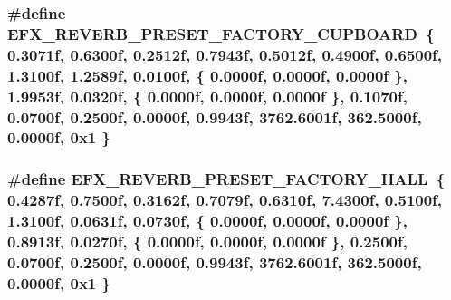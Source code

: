 \subsubsection[{\texorpdfstring{E\+F\+X\+\_\+\+R\+E\+V\+E\+R\+B\+\_\+\+P\+R\+E\+S\+E\+T\+\_\+\+F\+A\+C\+T\+O\+R\+Y\+\_\+\+C\+U\+P\+B\+O\+A\+RD}{EFX_REVERB_PRESET_FACTORY_CUPBOARD}}]{\setlength{\rightskip}{0pt plus 5cm}\#define E\+F\+X\+\_\+\+R\+E\+V\+E\+R\+B\+\_\+\+P\+R\+E\+S\+E\+T\+\_\+\+F\+A\+C\+T\+O\+R\+Y\+\_\+\+C\+U\+P\+B\+O\+A\+RD~\{ 0.\+3071f, 0.\+6300f, 0.\+2512f, 0.\+7943f, 0.\+5012f, 0.\+4900f, 0.\+6500f, 1.\+3100f, 1.\+2589f, 0.\+0100f, \{ 0.\+0000f, 0.\+0000f, 0.\+0000f \}, 1.\+9953f, 0.\+0320f, \{ 0.\+0000f, 0.\+0000f, 0.\+0000f \}, 0.\+1070f, 0.\+0700f, 0.\+2500f, 0.\+0000f, 0.\+9943f, 3762.\+6001f, 362.\+5000f, 0.\+0000f, 0x1 \}}\hypertarget{efx-presets_8h_a92403add280fb6a386b7c72ad1a39d32}{}\label{efx-presets_8h_a92403add280fb6a386b7c72ad1a39d32}
\subsubsection[{\texorpdfstring{E\+F\+X\+\_\+\+R\+E\+V\+E\+R\+B\+\_\+\+P\+R\+E\+S\+E\+T\+\_\+\+F\+A\+C\+T\+O\+R\+Y\+\_\+\+H\+A\+LL}{EFX_REVERB_PRESET_FACTORY_HALL}}]{\setlength{\rightskip}{0pt plus 5cm}\#define E\+F\+X\+\_\+\+R\+E\+V\+E\+R\+B\+\_\+\+P\+R\+E\+S\+E\+T\+\_\+\+F\+A\+C\+T\+O\+R\+Y\+\_\+\+H\+A\+LL~\{ 0.\+4287f, 0.\+7500f, 0.\+3162f, 0.\+7079f, 0.\+6310f, 7.\+4300f, 0.\+5100f, 1.\+3100f, 0.\+0631f, 0.\+0730f, \{ 0.\+0000f, 0.\+0000f, 0.\+0000f \}, 0.\+8913f, 0.\+0270f, \{ 0.\+0000f, 0.\+0000f, 0.\+0000f \}, 0.\+2500f, 0.\+0700f, 0.\+2500f, 0.\+0000f, 0.\+9943f, 3762.\+6001f, 362.\+5000f, 0.\+0000f, 0x1 \}}\hypertarget{efx-presets_8h_a77f1d495628c3b9943873adc18f5a979}{}\label{efx-presets_8h_a77f1d495628c3b9943873adc18f5a979}
